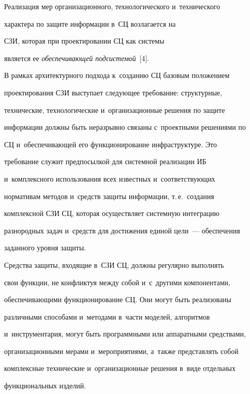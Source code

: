         

            \vspace*{-2pt}

     

    Реализация мер организационного, технологического и~технического 

характера по защите информации в~СЦ возлагается на 

СЗИ, которая при проектировании СЦ как сис\-те\-мы 

является ее \textit{обеспечивающей под\-сис\-те\-мой}~[4]. 

    

    В рамках архитектурного подхода к~созданию СЦ базовым положением 

проектирования СЗИ выступает следующее требование: структурные, 

технические, технологические и~организационные решения по защите 

информации должны быть неразрывно связаны с~проектными решениями по 

СЦ и~обеспечивающей его функционирование инфраструктуре. Это 

требование служит предпосылкой для сис\-тем\-ной реализации ИБ 

и~комплексного использования всех известных и~соответствующих 

нормативам методов и~средств защиты информации, т.\,е.\ создания 

комплексной СЗИ СЦ, которая осуществляет сис\-тем\-ную интеграцию 

разнородных задач и~средств для достижения единой цели~--- обеспечения 

заданного уровня защиты. 

    

    Средства защиты, входящие в~СЗИ СЦ, должны регулярно выполнять 

свои функции, не конфликтуя между собой и~с~другими компонентами, 

обеспечивающими функционирование СЦ. Они могут быть реализованы 

различными способами и~методами в~части моделей, алгоритмов 

и~инструментария, могут быть программными или аппаратными средствами, 

организационными мерами и~мероприятиями, а~также представлять собой 

комплексные технические и~организационные решения в~виде отдельных 

функциональных изделий.

